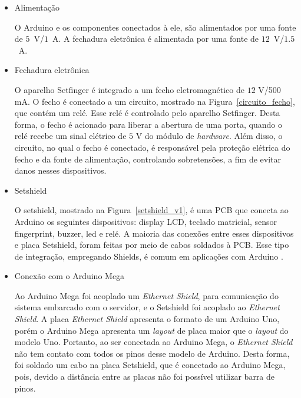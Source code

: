 \begin{itemize}

\item Alimentação

O Arduino e os componentes conectados à ele, são alimentados por uma fonte de \mbox{$5$ V/$1$ A}. A fechadura eletrônica é alimentada por uma fonte de \mbox{$12$ V/$1.5$ A}.

\item Fechadura eletrônica

O aparelho Setfinger é integrado a um fecho eletromagnético de $12$ V/500 mA. O fecho é conectado a um circuito, mostrado na Figura~\ref{circuito_fecho},
que contém um relé. Esse relé é controlado pelo aparelho Setfinger. Desta forma, o fecho é acionado para liberar a abertura de uma porta, quando o relé recebe um sinal elétrico de $5$ V do módulo de \textit{hardware}. Além disso, o circuito, no qual o fecho é conectado, é responsável pela proteção elétrica do fecho e da fonte de alimentação, controlando sobretensões, a fim de evitar danos nesses dispositivos.

\item Setshield

O setshield, mostrado na Figura~\ref{setshield_v1}, é uma PCB que conecta ao Arduino os seguintes dispositivos: display LCD, teclado matricial, sensor fingerprint, buzzer, led e relé. A maioria das conexões entre esses dispositivos e placa Setshield, foram feitas por meio de cabos soldados à PCB. Esse tipo de integração, empregando Shields, é comum em aplicações com Arduino \cite{isikdag2015enhanced, grimmett2014arduino, premeaux2012arduino}.

\item Conexão com o Arduino Mega

Ao Arduino Mega foi acoplado um \textit{Ethernet Shield}, para comunicação do sistema embarcado com o servidor, e o Setshield foi acoplado ao \textit{Ethernet Shield}. A placa \textit{Ethernet Shield} apresenta o formato de um Arduino Uno, porém o Arduino Mega apresenta um \textit{layout} de placa maior que o \textit{layout} do modelo Uno. Portanto, ao ser conectada ao Arduino Mega, o \textit{Ethernet Shield} não tem contato com todos os pinos desse modelo de Arduino. Desta forma, foi soldado um cabo na placa Setshield, que é conectado  ao Arduino Mega, pois, devido a distância entre as placas não foi possível utilizar barra de pinos.
    
\end{itemize}




